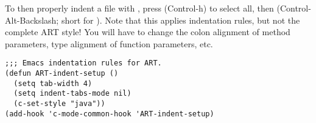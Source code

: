 To then properly indent a file with , press
 (Control-h) to select all, then
 (Control-Alt-Backslash; short for
).  Note that this applies 
indentation rules, but not the complete ART style! You will have to
change the colon alignment of method parameters, type alignment of
function parameters, etc.
%
\begin{verbatim}
;;; Emacs indentation rules for ART.
(defun ART-indent-setup ()
  (setq tab-width 4)
  (setq indent-tabs-mode nil)
  (c-set-style "java"))
(add-hook 'c-mode-common-hook 'ART-indent-setup)
\end{verbatim}


